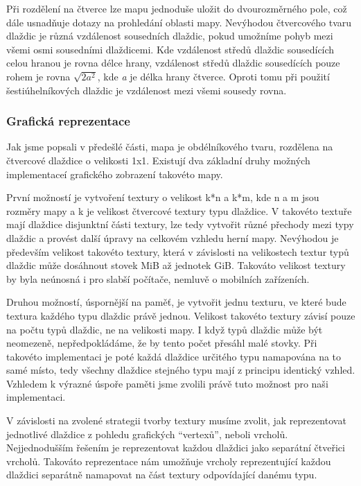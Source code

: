 Při rozdělení na čtverce lze mapu jednoduše uložit do dvourozměrného pole, což dále usnadňuje dotazy na prohledání oblasti mapy. Nevýhodou čtvercového tvaru dlaždic je různá vzdálenost sousedních dlaždic, pokud umožníme pohyb mezi všemi osmi sousedními dlaždicemi. Kde vzdálenost středů dlaždic sousedících celou hranou je rovna délce hrany, vzdálenost středů dlaždic sousedících pouze rohem je rovna \(\sqrt{2a^2}\), kde \textit{a} je délka hrany čtverce. Oproti tomu při použití šestiúhelníkových dlaždic je vzdálenost mezi všemi sousedy rovna. 



\subsubsection{Grafická reprezentace} 
Jak jsme popsali v předešlé části, mapa je obdélníkového tvaru, rozdělena na čtvercové dlaždice o velikosti 1x1. Existují dva základní druhy možných implementaceí grafického zobrazení takovéto mapy.

První možností je vytvoření textury o velikost k*n a k*m, kde n a m jsou rozměry mapy a k je velikost čtvercové textury typu dlaždice. V takovéto textuře mají dlaždice disjunktní části textury, lze tedy vytvořit různé přechody mezi typy dlaždic a provést další úpravy na celkovém vzhledu herní mapy. Nevýhodou je především velikost takovéto textury, která v závislosti na velikostech textur typů dlaždic může dosáhnout stovek MiB až jednotek GiB. Takováto velikost textury by byla neúnosná i pro slabší počítače, nemluvě o mobilních zařízeních. 

Druhou možností, úspornější na paměť, je vytvořit jednu texturu, ve které bude textura každého typu dlaždic právě jednou. Velikost takovéto textury závisí pouze na počtu typů dlaždic, ne na velikosti mapy. I když typů dlaždic může být neomezeně, nepředpokládáme, že by tento počet přesáhl malé stovky. Při takovéto implementaci je poté každá dlaždice určitého typu namapována na to samé místo, tedy všechny dlaždice stejného typu mají z principu identický vzhled. Vzhledem k výrazné úspoře paměti jsme zvolili právě tuto možnost pro naši implementaci.

V závislosti na zvolené strategii tvorby textury musíme zvolit, jak reprezentovat jednotlivé dlaždice z pohledu grafických ``vertexů'', neboli vrcholů. Nejjednodušším řešením je reprezentovat každou dlaždici jako separátní čtveřici vrcholů. Takováto reprezentace nám umožňuje vrcholy reprezentující každou dlaždici separátně namapovat na část textury odpovídající danému typu. 

